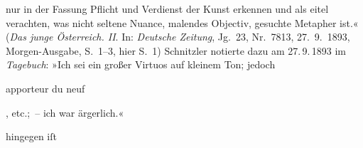 {{{                     nur in der Fassung Pflicht und Verdienst der Kunst erkennen und als eitel
                     verachten, was nicht seltene Nuance, malendes Objectiv, gesuchte Metapher
                     ist.« (\emph{Das junge Österreich. II}. In: \emph{Deutsche Zeitung}, Jg. 23, Nr. 7813, 27. 9. 1893, Morgen-Ausgabe, S. 1–3, hier
                     S. 1) Schnitzler notierte 
                  dazu am 27. 9. 1893
                  im \emph{Tagebuch}: »Ich sei ein großer
                     Virtuos auf kleinem Ton; jedoch \begin{otherlanguage}{french}apporteur du
                        neuf\end{otherlanguage}, etc.; – ich war ärgerlich.«}}}\label{K_L02718-2} hingegen iſt
